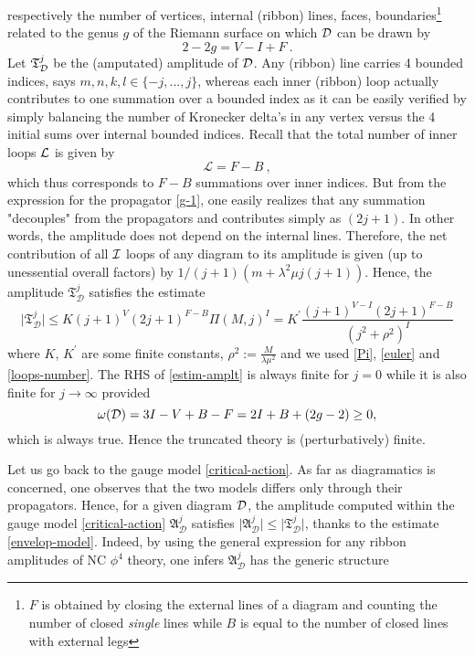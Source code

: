 \documentclass[a4paper,11pt,twoside]{article}
\numberwithin{equation}{section}
\theoremstyle{nonumberplain}
\newcounter{and}
\begin{document}
respectively the number of vertices, internal (ribbon) lines, faces, boundaries{\footnote{$F$ is obtained by closing the external lines of a diagram and counting the number of closed {\it{single}} lines while $B$ is equal to the number of closed lines with external legs}} related to the genus $g$ of the Riemann surface on which ${\cal{D}}$ can be drawn by%
%
\begin{equation}
2-2g=V-I+F \ . \label{euler}
\end{equation}
%
Let $\mathfrak{T}^j_{{\cal{D}}}$ be the (amputated) amplitude of ${\cal{D}}$. Any (ribbon) line carries 4 bounded indices, says $m,n,k,l\in\{-j,...,j\}$, whereas each inner (ribbon) loop actually contributes to one summation over a bounded index as it can be easily verified by simply balancing the number of Kronecker delta's in any vertex versus the 4 initial sums over internal bounded indices. Recall that the total number of inner loops ${\cal{L}}$ is given by%
%
\begin{equation}
\mathcal{L}=F-B \ , \label{loops-number}
\end{equation}
%
which thus corresponds to $F-B$ summations over inner indices. But from the expression for the propagator \eqref{g-1}, one easily realizes that any summation "decouples" from the propagators and contributes simply as $(2j+1)$. In other words, the amplitude does not depend on the internal lines. Therefore, the net contribution of all ${\cal{I}}$ loops of any diagram to its amplitude is given (up to unessential overall factors) by $1/(j+1)(m+\lambda^2\mu j(j+1))$. Hence, the amplitude $\mathfrak{T}^j_\mathcal{D}$ satisfies the estimate%
%
\begin{equation}
\vert \mathfrak{T}^j_{\mathcal{D}}\vert \le K(j+1)^V(2j+1)^{F-B}\Pi(M,j)^I=K^\prime\frac{(j+1)^{V-I}(2j+1)^{F-B}}{(j^2+\rho^2)^{I}}\label{estim-amplt}
\end{equation}
%
where $K$, $K^\prime$ are some finite constants, $\rho^2:=\frac{M}{\lambda\mu^2}$ and we used \eqref{Pi}, \eqref{euler} and \eqref{loops-number}. The RHS of \eqref{estim-amplt} is always finite for $j=0$ while it is also finite for $j\to\infty$ provided%
%
\begin{equation}
\omega({\cal{D}})=3I-V+B-F=2I+B+(2g-2)\ge0,\label{power-count}
\end{equation}
%
which is always true. Hence the truncated theory is (perturbatively) finite.\par%
%
Let us go back to the gauge model \eqref{critical-action}. As far as diagramatics is concerned, one observes that the two models differs only through their propagators. Hence, for a given diagram ${\cal{D}}$, the amplitude computed within the gauge model \eqref{critical-action} $\mathfrak{A}^j_{\mathcal{D}}$ satisfies $\vert \mathfrak{A}^j_{\mathcal{D}}\vert\le \vert \mathfrak{T}^j_{\mathcal{D}}\vert$, thanks to the estimate \eqref{envelop-model}. Indeed, by using the general expression for any ribbon amplitudes of NC $\phi^4$ theory, one infers $\mathfrak{A}^j_{\mathcal{D}}$ has the generic structure%
\end{document}
